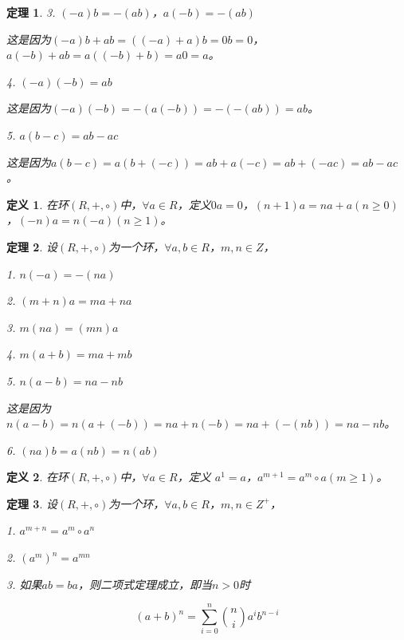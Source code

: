 \documentclass{article}
\newtheorem{Def}{定义}
\newtheorem{Thm}{定理}
\begin{document}
\begin{CJK*}{UTF8}{gbsn}
\begin{Thm}
    3. $(-a)b = -(ab)$，$a(-b)=-(ab)$
  
    这是因为$(-a)b+ab=((-a)+a)b=0b=0$，$a(-b)+ab=a((-b)+b)=a0=a$。
  
  
    4. $(-a)(-b)=ab$
  
    这是因为$(-a)(-b)=-(a(-b))=-(-(ab))=ab$。
  
    5. $a(b-c)=ab-ac$
  
    这是因为$a(b-c)=a(b+(-c))=ab+a(-c)=ab+(-ac)=ab-ac$。
  \end{Thm}
  
  \begin{Def}
    在环$(R,+,\circ)$中，$\forall a\in R$，定义$0a=0$，$(n+1)a=na+a(n\geq 0)$，$(-n)a=n(-a)(n\geq 1)$。
  \end{Def}
  
  \begin{Thm}
    设$(R,+,\circ)$为一个环，$\forall a,b \in R$，$m, n \in Z$，
  
    1. $n(-a)=-(na)$
  
    2. $(m+n)a=ma + na$
  
    3. $m(na)=(mn)a$
  
    4. $m(a+b) = ma + mb$
  
    5. $n(a-b) = na - nb$
  
    这是因为$n(a-b)=n(a+(-b))=na+n(-b)=na+(-(nb))=na-nb$。
  
    6. $(na)b=a(nb)=n(ab)$
  
    
  \end{Thm}
  
  \begin{Def}
    在环$(R,+,\circ)$中，$\forall a\in R$，定义
    $a^1=a$，$a^{m+1}=a^m\circ a(m\geq 1)$。
  \end{Def}
  
  \begin{Thm}
    设$(R,+,\circ)$为一个环，$\forall a,b \in R$，$m, n \in Z^+$，
  
    1. $a^{m+n}=a^m \circ a^n$
  
    2. $(a^{m})^n=a^{mn}$
  
    3. 如果$ab=ba$，则二项式定理成立，即当$n>0$时
  
    \[(a+b)^n=\sum_{i=0}^{n}\binom{n}{i}a^ib^{n-i}\]
  \end{Thm}
  

\end{CJK*}
\end{document}
